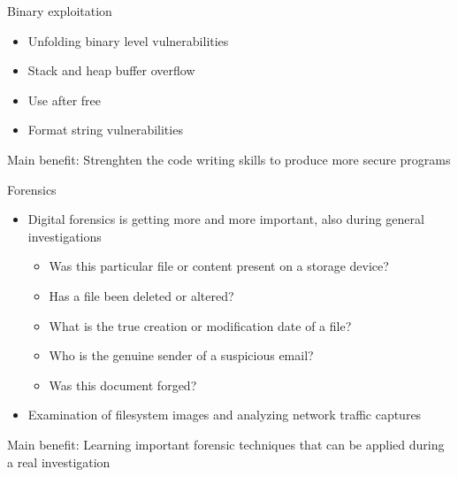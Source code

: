 \documentclass[12 pt]{beamer}
\begin{document}
\begin{frame}{Binary exploitation}

  \begin{itemize}
    \item{Unfolding binary level vulnerabilities}
    \item{Stack and heap buffer overflow}
    \item{Use after free}
    \item{Format string vulnerabilities}
  \end{itemize}

  \begin{exampleblock}{}
    Main benefit: Strenghten the code writing skills to produce more secure programs
  \end{exampleblock}

\end{frame}

\begin{frame}{Forensics}

  \begin{itemize}
    \item{Digital forensics is getting more and more important, also during general investigations}
      \begin{itemize}
        \item{Was this particular file or content present on a storage
          device?}
        \item{Has a file been deleted or altered?}
        \item{What is the true creation or modification date of a file?}
        \item{Who is the genuine sender of a suspicious email?}
        \item{Was this document forged?}
      \end{itemize}
    \item{Examination of filesystem images and analyzing network traffic captures}
  \end{itemize}

  \begin{exampleblock}{}
    Main benefit: Learning important forensic techniques that can be applied during a real investigation
  \end{exampleblock}

\end{frame}
\end{document}
